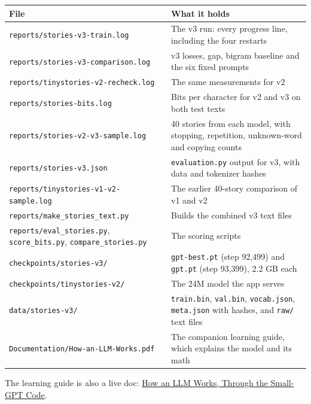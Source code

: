 \documentclass[11pt,a4paper]{article}
\newcommand{\code}[1]{\texttt{#1}}
\begin{document}
{\small
\begin{longtable}{@{}>{\raggedright\arraybackslash\hspace{0pt}}p{}>{\raggedright\arraybackslash\hspace{0pt}}p{}@{}}
\toprule
\textbf{File} & \textbf{What it holds} \\
\midrule
\endhead
\code{reports/\allowbreak{}stories-\allowbreak{}v3-\allowbreak{}train.\allowbreak{}log} & The v3 run: every progress line, including the four restarts \\
\code{reports/\allowbreak{}stories-\allowbreak{}v3-\allowbreak{}comparison.\allowbreak{}log} & v3 losses, gap, bigram baseline and the six fixed prompts \\
\code{reports/\allowbreak{}tinystories-\allowbreak{}v2-\allowbreak{}recheck.\allowbreak{}log} & The same measurements for v2 \\
\code{reports/\allowbreak{}stories-\allowbreak{}bits.\allowbreak{}log} & Bits per character for v2 and v3 on both test texts \\
\code{reports/\allowbreak{}stories-\allowbreak{}v2-\allowbreak{}v3-\allowbreak{}sample.\allowbreak{}log} & 40 stories from each model, with stopping, repetition, unknown-word and copying counts \\
\code{reports/\allowbreak{}stories-\allowbreak{}v3.\allowbreak{}json} & \code{evaluation.\allowbreak{}py} output for v3, with data and tokenizer hashes \\
\code{reports/\allowbreak{}tinystories-\allowbreak{}v1-\allowbreak{}v2-\allowbreak{}sample.\allowbreak{}log} & The earlier 40-story comparison of v1 and v2 \\
\code{reports/\allowbreak{}make\_\allowbreak{}stories\_\allowbreak{}text.\allowbreak{}py} & Builds the combined v3 text files \\
\code{reports/\allowbreak{}eval\_\allowbreak{}stories.\allowbreak{}py}, \code{score\_\allowbreak{}bits.\allowbreak{}py}, \code{compare\_\allowbreak{}stories.\allowbreak{}py} & The scoring scripts \\
\code{checkpoints/\allowbreak{}stories-\allowbreak{}v3/\allowbreak{}} & \code{gpt-\allowbreak{}best.\allowbreak{}pt} (step 92,499) and \code{gpt.\allowbreak{}pt} (step 93,399), 2.2 GB each \\
\code{checkpoints/\allowbreak{}tinystories-\allowbreak{}v2/\allowbreak{}} & The 24M model the app serves \\
\code{data/\allowbreak{}stories-\allowbreak{}v3/\allowbreak{}} & \code{train.\allowbreak{}bin}, \code{val.\allowbreak{}bin}, \code{vocab.\allowbreak{}json}, \code{meta.\allowbreak{}json} with hashes, and \code{raw/\allowbreak{}} text files \\
\code{Documentation/\allowbreak{}How-\allowbreak{}an-\allowbreak{}LLM-\allowbreak{}Works.\allowbreak{}pdf} & The companion learning guide, which explains the model and its math \\
\bottomrule
\end{longtable}
}

The learning guide is also a live doc: \href{https://claude.ai/artifact/R3G4VxpeSRLPmVsaFWrdPL}{How an LLM Works, Through the Small-GPT Code}.
\end{document}

